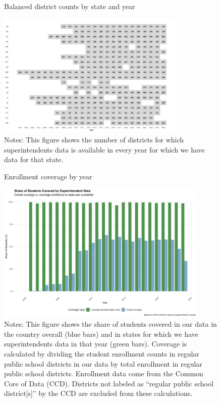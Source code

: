 \documentclass[12pt]{article}
\begin{document}
\begin{figure}[H]
    \caption{Balanced district counts by state and year}
    \label{tab:balanced_district_counts_by_state_year}
    \centering
    \includegraphics[width=0.8\textwidth]{figures/balanced_district_counts_by_state_year.png}
     \caption*{\footnotesize Notes: This figure shows the number of districts for which superintendents data is available in every year for which we have data for that state.}
\end{figure}

\begin{figure}[H]
    \caption{Enrollment coverage by year}
    \label{fig:student_coverage_by_year}
    \centering
    \includegraphics[width=0.9\textwidth]{figures/student_coverage_by_year.png}
     \caption*{\footnotesize Notes: This figure shows the share of students covered in our data in the country overall (blue bars) and in states for which we have superintendents data in that year (green bars). Coverage is calculated by dividing the student enrollment counts in regular public school districts in our data by total enrollment in regular public school districts. Enrollment data come from the Common Core of Data (CCD). Districts not labeled as ``regular public school district[s]'' by the CCD are excluded from these calculations.}
\end{figure}
\end{document}
